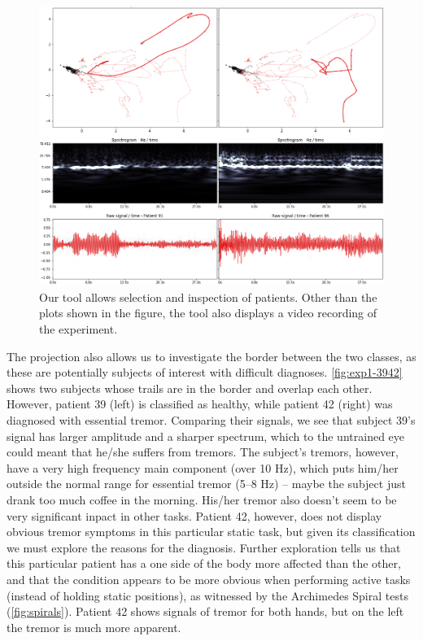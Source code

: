 \begin{figure}[ht]
\centering
\includegraphics[width=\linewidth]{figures/nemo/exp1-9196.png}
\caption{Our tool allows selection and inspection of patients. Other than the plots shown in the figure, the tool also displays a video recording of the experiment. }
\label{fig:exp1-9196}
\end{figure}

The projection also allows us to investigate the border between the two classes, as these are potentially subjects of interest with difficult diagnoses.
\cref{fig:exp1-3942} shows two subjects whose trails are in the border and overlap each other. However, patient 39 (left) is classified as healthy, while patient 42 (right) was diagnosed with essential tremor. Comparing their signals, we see that subject 39's signal has larger amplitude and a sharper spectrum, which to the untrained eye could meant that he/she suffers from tremors. The subject's tremors, however, have a very high frequency main component (over 10 Hz), which puts him/her outside the normal range for essential tremor (5--8 Hz) -- maybe the subject just drank too much coffee in the morning. His/her tremor also doesn't seem to be very significant inpact in other tasks. Patient 42, however, does not display obvious tremor symptoms in this particular static task, but given its classification we must explore the reasons for the diagnosis. Further exploration tells us that this particular patient has a one side of the body more affected than the other, and that the condition appears to be more obvious when performing active tasks (instead of holding static positions), as witnessed by the Archimedes Spiral tests (\cref{fig:spirals}). Patient 42 shows signals of tremor for both hands, but on the left the tremor is much more apparent.

